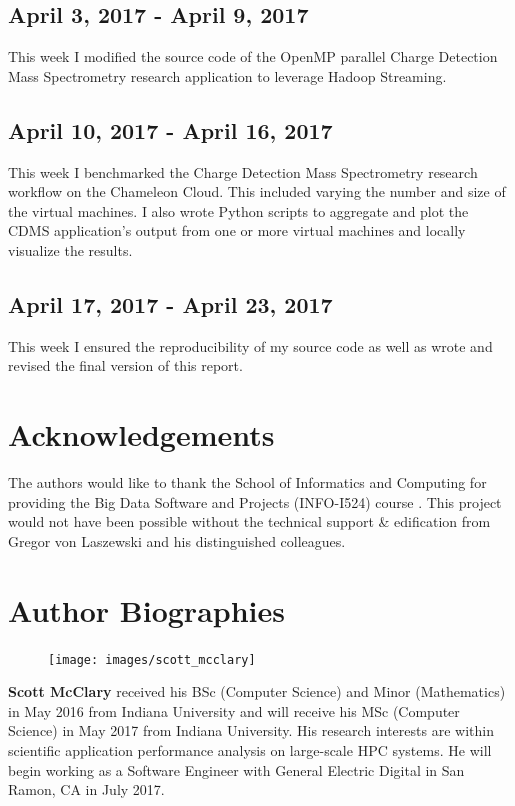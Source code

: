 \documentclass[9pt,twocolumn,twoside]{../../styles/osajnl}
\begin{document}
\subsection{April 3, 2017 - April 9, 2017}
This week I modified the source code of the OpenMP parallel Charge
Detection Mass Spectrometry research application to leverage Hadoop
Streaming.
\subsection{April 10, 2017 - April 16, 2017}
This week I benchmarked the Charge Detection Mass Spectrometry
research workflow on the Chameleon Cloud. This included varying the
number and size of the virtual machines. I also wrote Python scripts
to aggregate and plot the CDMS application's output from one or more
virtual machines and locally visualize the results.
\subsection{April 17, 2017 - April 23, 2017}
This week I ensured the reproducibility of my source code as well as
wrote and revised the final version of this report.


\section*{Acknowledgements}
The authors would like to thank the School of Informatics and
Computing for providing the Big Data Software and Projects (INFO-I524)
course \cite{www-i524}. This project would not have been possible
without the technical support \& edification from Gregor von Laszewski
and his distinguished colleagues.

 
\section*{Author Biographies}
\begingroup
\setlength\intextsep{0pt}
\begin{minipage}[t][3.2cm][t]{1.0\columnwidth} 
  \begin{figure}
    \texttt{[image: images/scott\_mcclary]}
  \end{figure}
  \noindent
  {\bfseries Scott McClary} received his BSc (Computer Science) and
  Minor (Mathematics) in May 2016 from Indiana University and will
  receive his MSc (Computer Science) in May 2017 from Indiana
  University. His research interests are within scientific application
  performance analysis on large-scale HPC systems. He will begin
  working as a Software Engineer with General Electric Digital in San
  Ramon, CA in July 2017.
\end{minipage}
\endgroup
\end{document}
